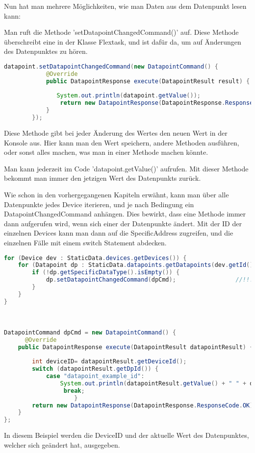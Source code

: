 Nun hat man mehrere Möglichkeiten, wie man Daten aus dem Datenpunkt lesen kann:
\begin{compactenum}
    \item Man ruft die Methode 'setDatapointChangedCommand()' auf. Diese Methode überschreibt eine in der Klasse Flextask, und ist dafür da, um auf Änderungen des Datenpunktes zu hören.
    
    \begin{lstlisting}[language=java,caption=Example datapoint usage,label=lst:impl:foo]
        datapoint.setDatapointChangedCommand(new DatapointCommand() { 
            @Override 
            public DatapointResponse execute(DatapointResult result) { 
         
               System.out.println(datapoint.getValue()); 
                return new DatapointResponse(DatapointResponse.ResponseCode.OK); 
            } 
        }); 
    \end{lstlisting}
    Diese Methode gibt bei jeder Änderung des Wertes den neuen Wert in der Konsole aus. Hier kann man den Wert speichern, andere Methoden ausführen, oder sonst alles machen, was man in einer Methode machen könnte.

    \item Man kann jederzeit im Code 'datapoint.getValue()' aufrufen. Mit dieser Methode bekommt man immer den jetzigen Wert des Datenpunkts zurück.
    \item Wie schon in den vorhergegangenen Kapiteln erwähnt, kann man über alle Datenpunkte jedes Device iterieren, und je nach Bedingung ein DatapointChangedCommand anhängen. Dies bewirkt, dass eine Methode immer dann aufgerufen wird, wenn sich einer der Datenpunkte ändert. Mit der ID der einzelnen Devices kann man dann auf die SpecificAddress zugreifen, und die einzelnen Fälle mit einem switch Statement abdecken.
    \begin{lstlisting}[language=java,caption=Example multible datapoint usage,label=lst:impl:foo]
        for (Device dev : StaticData.devices.getDevices()) { 
    for (Datapoint dp : StaticData.datapoints.getDatapoints(dev.getId())) { 
        if (!dp.getSpecificDataType().isEmpty()) { 
            dp.setDatapointChangedCommand(dpCmd);                 //!!! 
        } 
    } 
} 

 

DatapointCommand dpCmd = new DatapointCommand() { 
      @Override 
    public DatapointResponse execute(DatapointResult datapointResult) { 
 
        int deviceID= datapointResult.getDeviceId();  
        switch (datapointResult.getDpId()) { 
            case "datapoint_example_id": 
                System.out.println(datapointResult.getValue() + " " + deviceID ); 
                 break; 
                    } 
        return new DatapointResponse(DatapointResponse.ResponseCode.OK); 
    } 
}; 

    \end{lstlisting}
    In diesem Beispiel werden die DeviceID und der aktuelle Wert des Datenpunktes, welcher sich geändert hat, ausgegeben.
\end{compactenum}

